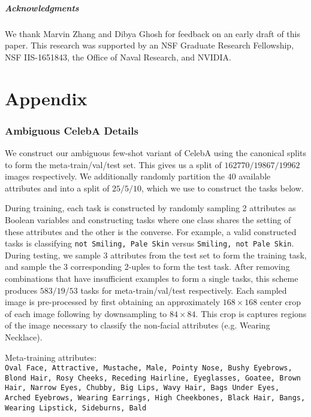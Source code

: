 \documentclass{article}
\begin{document}
 

\vspace{-0.1cm}
\subsubsection*{Acknowledgments}
\vspace{-0.1cm}
We thank Marvin Zhang and Dibya Ghosh for feedback on an early draft of this paper. This research was supported by an NSF Graduate Research Fellowship, NSF IIS-1651843, the Office of Naval Research, and NVIDIA.





\appendix
\newpage
\part*{Appendix}
\label{appendix}

\section{Ambiguous CelebA Details}

We construct our ambiguous few-shot variant of CelebA using the canonical splits to form the meta-train/val/test set. This gives us a split of $162770/19867/ 19962$ images respectively. We additionally randomly partition the $40$ available attributes and into a split of $25/5/10$, which we use to construct the tasks below.
 
During training, each task is constructed by randomly sampling 2 attributes as Boolean variables and constructing tasks where one class shares the setting of these attributes and the other is the converse. For example, a valid constructed tasks is classifying \texttt{not Smiling, Pale Skin} versus \texttt{Smiling, not Pale Skin}. During testing, we sample 3 attributes from the test set to form the training task, and sample the 3 corresponding 2-uples to form the test task. After removing combinations that have insufficient examples to form a single tasks, this scheme produces $583/19/53$ tasks for meta-train/val/test respectively. Each sampled image is pre-processed by first obtaining an approximately $168 \times 168$ center crop of each image following by downsampling to $84 \times 84$. This crop is captures regions of the image necessary to classify the non-facial attributes (e.g. Wearing Necklace).

Meta-training attributes: \\
{ \small \texttt{Oval Face, Attractive, Mustache, Male, Pointy Nose, Bushy Eyebrows, Blond Hair, Rosy Cheeks, Receding Hairline, Eyeglasses, Goatee, Brown Hair, Narrow Eyes, Chubby, Big Lips, Wavy Hair, Bags Under Eyes, Arched Eyebrows, Wearing Earrings, High Cheekbones, Black Hair, Bangs, Wearing Lipstick, Sideburns, Bald}}
\end{document}
